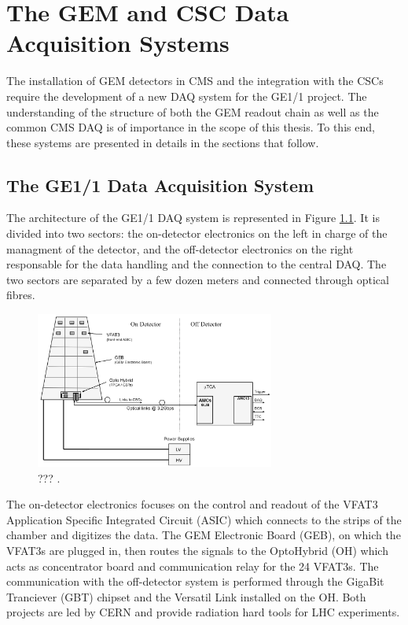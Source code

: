 \chapter{The GEM and CSC Data Acquisition Systems}
\label{chap:II-2-daq}

  The installation of GEM detectors in CMS and the integration with the CSCs require the development of a new DAQ system for the GE1/1 project. The understanding of the structure of both the GEM readout chain as well as the common CMS DAQ is of importance in the scope of this thesis. To this end, these systems are presented in details in the sections that follow. \\

  \section{The GE1/1 Data Acquisition System}

    The architecture of the GE1/1 DAQ system is represented in Figure \ref{fig:II-2-daq-gem-system}. It is divided into two sectors: the on-detector electronics on the left in charge of the managment of the detector, and the off-detector electronics on the right responsable for the data handling and the connection to the central DAQ. The two sectors are separated by a few dozen meters and connected through optical fibres. \\

    \begin{figure}[h!]
      \centering
      \includegraphics[width=0.7\textwidth]{img/II-2-daq/gem-system.pdf}
      \caption{??? \cite{Colaleo:2021453}.}
      \label{fig:II-2-daq-gem-system}
    \end{figure}

    The on-detector electronics focuses on the control and readout of the VFAT3 Application Specific Integrated Circuit (ASIC) which connects to the strips of the chamber and digitizes the data. The GEM Electronic Board (GEB), on which the VFAT3s are plugged in, then routes the signals to the OptoHybrid (OH) which acts as concentrator board and communication relay for the 24 VFAT3s. The communication with the off-detector system is performed through the GigaBit Tranciever (GBT) chipset and the Versatil Link installed on the OH. Both projects are led by CERN and provide radiation hard tools for LHC experiments. \\


